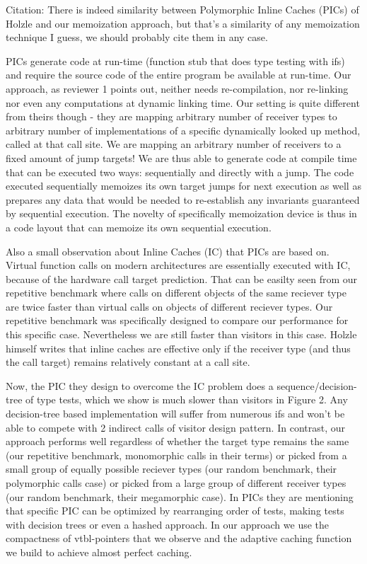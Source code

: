 Citation\cite{Holzle:Chambers:Ungar:91}:
There is indeed similarity between Polymorphic Inline Caches (PICs) of Holzle 
and our memoization approach, but that's a similarity of any memoization 
technique I guess, we should probably cite them in any case.

PICs generate code at run-time (function stub that does type testing with ifs) 
and require the source code of the entire program be available at run-time. Our 
approach, as reviewer 1 points out, neither needs re-compilation, nor re-linking 
nor even any computations at dynamic linking time. Our setting is quite 
different from theirs though - they are mapping arbitrary number of receiver 
types to arbitrary number of implementations of a specific dynamically looked up 
method, called at that call site. We are mapping an arbitrary number of 
receivers to a fixed amount of jump targets! We are thus able to generate code 
at compile time that can be executed two ways: sequentially and directly with a 
jump. The code executed sequentially memoizes its own target jumps for next 
execution as well as prepares any data that would be needed to re-establish any 
invariants guaranteed by sequential execution. The novelty of specifically 
memoization device is thus in a code layout that can memoize its own sequential 
execution. 

Also a small observation about Inline Caches (IC) that PICs are based on. 
Virtual function calls on modern architectures are essentially executed with IC, 
because of the hardware call target prediction. That can be easilty seen from 
our repetitive benchmark where calls on different objects of the same reciever 
type are twice faster than virtual calls on objects of different reciever types. 
Our repetitive benchmark was specifically designed to compare our performance 
for this specific case. Nevertheless we are still faster than visitors in this 
case. Holzle himself writes that inline caches are effective only if the 
receiver type (and thus the call target) remains relatively constant at a call 
site. 

Now, the PIC they design to overcome the IC problem does a 
sequence/decision-tree of type tests, which we show is much slower than visitors 
in Figure 2. Any decision-tree based implementation will suffer from numerous 
ifs and won't be able to compete with 2 indirect calls of visitor design 
pattern.  In contrast, our approach performs well regardless of whether the 
target type remains the same (our repetitive benchmark, monomorphic calls in 
their terms) or picked from a small group of equally possible reciever types 
(our random benchmark, their polymorphic calls case) or picked from a large 
group of different receiver types (our random benchmark, their megamorphic 
case). In PICs they are mentioning that specific PIC can be optimized by 
rearranging order of tests, making tests with decision trees or even a hashed 
approach. In our approach we use the compactness of vtbl-pointers that we 
observe and the adaptive caching function we build to achieve almost perfect 
caching.

